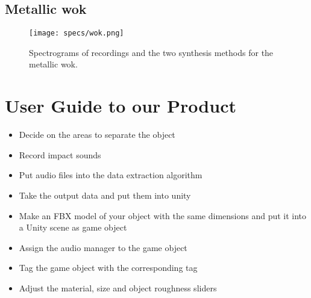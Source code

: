 \newpage

\section*{Metallic wok}

\begin{figure}[H]
  \centering
    \texttt{[image: specs/wok.png]}
      \caption{Spectrograms of recordings and the two synthesis methods for the metallic wok.}
      \label{fig:sp_wok}
\end{figure}

\newpage

\chapter{User Guide to our Product}\label{ap:guide}

\begin{itemize}
\item Decide on the areas to separate the object
\item Record impact sounds
\item Put audio files into the data extraction algorithm
\item Take the output data and put them into unity
\item Make an FBX\textsuperscript{\textregistered} model of your object with the same dimensions and put it into a Unity\textsuperscript{\textregistered} scene as game object
\item Assign the audio manager to the game object
\item Tag the game object with the corresponding tag
\item Adjust the material, size and object roughness sliders
\end{itemize}


